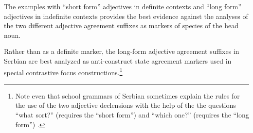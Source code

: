 The examples with “short form” adjectives in definite contexts and “long form” adjectives in indefinite contexts provides the best evidence against the analyses of the two different adjective agreement suffixes as markers of species of the head noun. 

Rather than as a definite marker, the long-form adjective agreement suffixes in Serbian are best analyzed as anti\hyp{}construct state agreement markers used in special contrastive focus constructions.\footnote{Note even that school grammars of Serbian sometimes explain the rules for the use of the two adjective declensions with the help of the the questions “what sort?” (requires the “short form”) and “which one?” (requires the “long form”) \cite[327]{browne1993}.}

